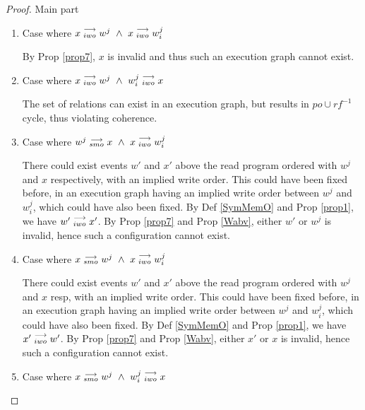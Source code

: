\begin{proof}{Main part}
\begin{itemize}
\begin{enumerate}
                            \item Case where $x\stackrel{\longrightarrow}{_{iwo}}w^j \ \wedge \ x\stackrel{\longrightarrow}{_{iwo}}w_i^j$
                            
                                By Prop \ref{prop7}, $x$ is invalid and thus such an execution graph cannot exist.  
                            
                            \item Case where $x\stackrel{\longrightarrow}{_{iwo}}w^j \ \wedge \ w_i^j\stackrel{\longrightarrow}{_{iwo}}x$
                        
                                The set of relations can exist in an execution graph, but results in $po \cup rf^{-1}$ cycle, thus violating coherence. 
                        
                            \item Case where $w^j\stackrel{\longrightarrow}{_{smo}}x \ \wedge \ x\stackrel{\longrightarrow}{_{iwo}}w_i^j$
                                
                                There could exist events $w'$ and $x'$ above the read program ordered with $w^j$ and $x$ respectively, with an implied write order. 
                                This could have been fixed before, in an execution graph having an implied write order between $w^j$ and $w_i^j$, which could have also been fixed.
                                By Def \ref{SymMemO} and Prop \ref{prop1}, we have $w'\stackrel{\longrightarrow}{_{iwo}}x'$. 
                                By Prop \ref{prop7} and Prop \ref{Wabv}, either $w'$ or $w^j$ is invalid, hence such a configuration cannot exist.           
                            
                            \item Case where $x\stackrel{\longrightarrow}{_{smo}}w^j \ \wedge \ x\stackrel{\longrightarrow}{_{iwo}}w_i^j$
                         
                                There could exist events $w'$ and $x'$ above the read program ordered with $w^j$ and $x$ resp, with an implied write order. This could have been fixed before, in an execution graph having an implied write order between $w^j$ and $w_i^j$, which could have also been fixed.
                                By Def \ref{SymMemO} and Prop \ref{prop1}, we have $x'\stackrel{\longrightarrow}{_{iwo}}w'$. 
                                By Prop \ref{prop7} and Prop \ref{Wabv}, either $x'$ or $x$ is invalid, hence such a configuration cannot exist.
                            
                            \item Case where $x\stackrel{\longrightarrow}{_{smo}}w^j \ \wedge \ w_i^j\stackrel{\longrightarrow}{_{iwo}}x$
                            

\end{enumerate}
\end{itemize}
\end{proof}
